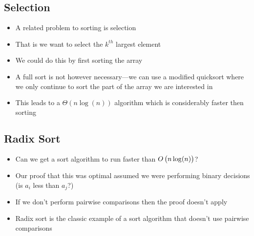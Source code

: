 \begin{slide}
\section{Selection}

\begin{PauseHighLight}
  \begin{itemize}
  \item A related problem to sorting is selection\pause
  \item That is we want to select the $k^{th}$ largest element\pause
  \item We could do this by first sorting the array\pause
  \item A full sort is not however necessary\pause---we can use a
    modified quicksort where we only continue to sort the part of the
    array we are interested in\pause
  \item This leads to a $\Theta(n\log(n))$ algorithm which is
    considerably faster then sorting\pause
  \end{itemize}
\end{PauseHighLight}

\end{slide}


\Outline %

\begin{slide}
\section{Radix Sort}

\begin{PauseHighLight}
  \begin{itemize}
  \item Can we get a sort algorithm to run faster than $O\left(\strut
      n\log(n) \right)$?\pause
  \item Our proof that this was optimal assumed we were performing
    binary decisions (is $a_i$ less than $a_j$?)\pause
  \item If we don't perform pairwise comparisons then the proof doesn't
    apply\pause
  \item Radix sort is the classic example of a sort algorithm that
  doesn't use pairwise comparisons\pause
  \end{itemize}
\end{PauseHighLight}

\end{slide}

